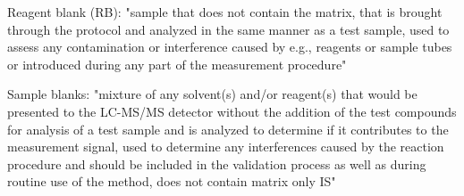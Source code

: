 Reagent blank (RB): "sample that does not contain the matrix, that is brought through the protocol and analyzed in the same manner as a test sample, used to assess any contamination or interference caused by e.g., reagents or sample tubes or introduced during any part of the measurement procedure"

Sample blanks: "mixture of any solvent(s) and/or reagent(s) that would be presented to the LC-MS/MS detector without the addition of the test compounds for analysis of a test sample and is analyzed to determine if it contributes to the measurement signal, used to determine any interferences caused by the reaction procedure and should be included in the validation process as well as during routine use of the method, does not contain matrix only IS"
